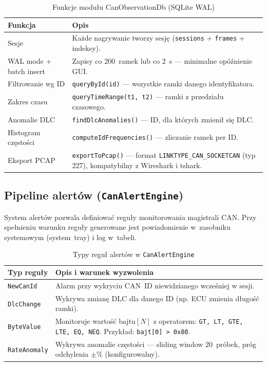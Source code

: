 \documentclass[12pt, a4paper]{article}
\begin{document}
\begin{table}[H]
\caption{Funkcje modułu CanObservationDb (SQLite WAL)}
\label{tab:sqlitedb}
\centering
\small
\begin{tabular}{p{5.5cm}p{9.0cm}}
\toprule
\textbf{Funkcja} & \textbf{Opis} \\
\midrule
Sesje & Każde nagrywanie tworzy sesję (\texttt{sessions} + \texttt{frames} + indeksy). \\
WAL mode + batch insert &
  Zapisy co 200~ramek lub co 2~s --- minimalne opóźnienie GUI. \\
Filtrowanie wg ID &
  \texttt{queryById(id)} --- wszystkie ramki danego identyfikatora. \\
Zakres czasu &
  \texttt{queryTimeRange(t1, t2)} --- ramki z przedziału czasowego. \\
Anomalie DLC &
  \texttt{findDlcAnomalies()} --- ID, dla których zmienił się DLC. \\
Histogram częstości &
  \texttt{computeIdFrequencies()} --- zliczanie ramek per ID. \\
Eksport PCAP &
  \texttt{exportToPcap()} --- format \texttt{LINKTYPE\_CAN\_SOCKETCAN} (typ 227),
  kompatybilny z Wireshark i tshark. \\
\bottomrule
\end{tabular}
\end{table}

\subsection{Pipeline alertów (\texttt{CanAlertEngine})}

System alertów pozwala definiować reguły monitorowania magistrali CAN.
Przy spełnieniu warunku reguły generowane jest powiadomienie w~zasobniku
systemowym (system~tray) i log w~tabeli.

\begin{table}[H]
\caption{Typy reguł alertów w \texttt{CanAlertEngine}}
\label{tab:alerts}
\centering
\small
\begin{tabular}{p{3.5cm}p{11.0cm}}
\toprule
\textbf{Typ reguły} & \textbf{Opis i warunek wyzwolenia} \\
\midrule
\texttt{NewCanId} &
  Alarm przy wykryciu CAN~ID niewidzianego wcześniej w sesji. \\
\texttt{DlcChange} &
  Wykrywa zmianę DLC dla danego ID (np. ECU zmienia długość ramki). \\
\texttt{ByteValue} &
  Monitoruje wartość bajtu$[N]$ z operatorem: \texttt{GT, LT, GTE, LTE, EQ, NEQ}.
  Przykład: \texttt{bajt[0] > 0x80}. \\
\texttt{RateAnomaly} &
  Wykrywa anomalie częstości --- sliding window 20~próbek,
  próg odchylenia $\pm\%$ (konfigurowalny). \\
\bottomrule
\end{tabular}
\end{table}
\end{document}
